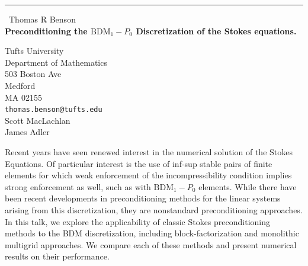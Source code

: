 \documentclass{report}
\begin{document}
\begin{center}
\rule{6in}{1pt} \
{\large Thomas R Benson \\
{\bf Preconditioning the $\text{BDM}_1-P_0$ Discretization of the Stokes equations.}}

Tufts University \\ Department of Mathematics \\ 503 Boston Ave \\ Medford \\ MA 02155
\\
{\tt thomas.benson@tufts.edu}\\
Scott MacLachlan\\
James Adler\end{center}

Recent years have seen renewed interest in the numerical solution of the
Stokes Equations. Of particular interest is the use of inf-sup stable
pairs of finite elements for which weak enforcement of the
incompressibility condition implies strong enforcement as well, such as
with $\text{BDM}_1-P_0$ elements. While there have been recent
developments in preconditioning methods for the linear systems arising
from this discretization, they are nonstandard preconditioning
approaches. In this talk, we explore the applicability of classic Stokes
preconditioning methods to the BDM discretization, including
block-factorization and monolithic multigrid approaches. We compare each
of these methods and present numerical results on their performance.
\end{document}
